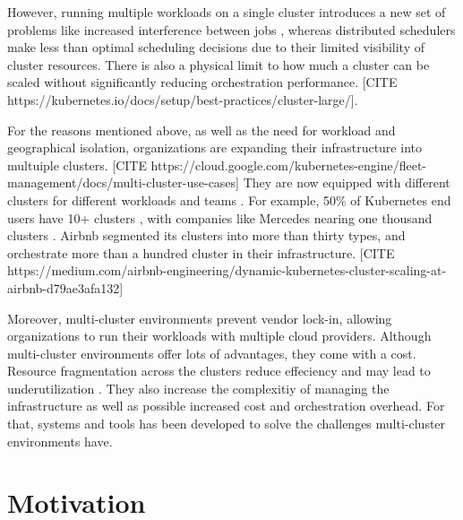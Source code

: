 However, running multiple workloads on a single cluster introduces a new set of problems
like increased interference between jobs 
, whereas distributed schedulers make less than optimal scheduling decisions due to their
limited visibility of cluster resources.
There is also a physical limit to how much a cluster can be scaled without
significantly reducing orchestration performance. [CITE
https://kubernetes.io/docs/setup/best-practices/cluster-large/].

For the reasons mentioned above, as well as the need for workload and
geographical isolation, organizations are expanding their infrastructure into
multuiple clusters. [CITE
https://cloud.google.com/kubernetes-engine/fleet-management/docs/multi-cluster-use-cases]
\cite{google-cloud-blog} They are now equipped with different clusters
for different workloads and teams \cite{patel_what_2022, li_lyra_2023}. For
example, 50\% of Kubernetes \cite{borg} end users have 10+ clusters
\cite{noauthor_cncf_2023}, with companies like Mercedes nearing one thousand
clusters \cite{noauthor_mercedes-benz_2023}. Airbnb segmented its clusters into
more than thirty types, and orchestrate more than a hundred cluster in their
infrastructure. [CITE
https://medium.com/airbnb-engineering/dynamic-kubernetes-cluster-scaling-at-airbnb-d79ae3afa132] 

Moreover, multi-cluster environments prevent vendor lock-in, allowing
organizations to run their workloads with multiple cloud providers. Although
multi-cluster environments offer lots of advantages, they come with a cost.
Resource fragmentation across the clusters reduce effeciency and may lead to
underutilization \cite{adv-dis-mutli}. They also increase the complexitiy of
managing the infrastructure as well as possible increased cost and
orchestration overhead. For that, systems and tools has been developed to solve
the challenges multi-cluster environments have. 


\section{Motivation}

